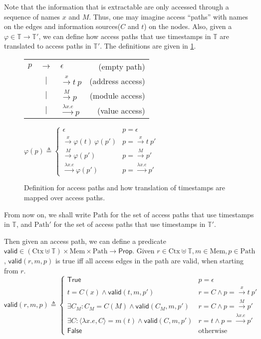 \documentclass{article}
\theoremstyle{definition}
\newcommand*{\Time}{\mathbb{T}}
\newcommand*{\Ctx}{\text{Ctx}}
\newcommand*{\Mem}{\text{Mem}}
\newcommand*{\mem}{m}
\newcommand*{\valid}{\mathsf{valid}}
\newcommand*{\Path}{\text{Path}}
\begin{document}
Note that the information that is extractable are only accessed through a sequence of names $x$ and $M$.
Thus, one may imagine access ``paths'' with names on the edges and information sources($C$ and $t$) on the nodes.
Also, given a $\varphi\in\Time\rightarrow\Time'$, we can define how access paths that use timestamps in $\Time$ are translated to access paths in $\Time'$.
The definitions are given in \ref{fig:accpath}.
\begin{figure}[h!]
  \centering
  \begin{tabular}{rclr}
    $p$ & $\rightarrow$ & $\epsilon$                   & (empty path)     \\
        & $|$           & $\xrightarrow{x}t\:p$        & (address access) \\
        & $|$           & $\xrightarrow{M}p$           & (module access)  \\
        & $|$           & $\xrightarrow{\lambda x.e}p$ & (value access)
  \end{tabular}\:
  $
    \varphi(p)\triangleq
    \begin{cases}
      \epsilon                               & p=\epsilon                    \\
      \xrightarrow{x}\varphi(t)\:\varphi(p') & p=\xrightarrow{x}t\:p'        \\
      \xrightarrow{M}\varphi(p')             & p=\xrightarrow{M}p'           \\
      \xrightarrow{\lambda x.e}\varphi(p')   & p=\xrightarrow{\lambda x.e}p'
    \end{cases}
  $
  \caption{Definition for access paths and how translation of timestamps are mapped over access paths.}
  \label{fig:accpath}
\end{figure}
From now on, we shall write $\Path$ for the set of access paths that use timestamps in $\Time$, and $\Path'$ for the set of access paths that use timestamps in $\Time'$.

Then given an access path, we can define a predicate $\valid\in(\Ctx\uplus\Time)\times\Mem\times\Path\rightarrow\mathsf{Prop}$.
Given $r\in\Ctx\uplus\Time,\mem\in\Mem,p\in\Path$, $\valid(r,\mem,p)$ is true iff all access edges in the path are valid, when starting from $r$.
\[
  \valid(r,\mem,p)\triangleq
  \begin{cases}
    \mathsf{True}                                                       & p=\epsilon                             \\
    t=C(x)\land\valid(t,\mem,p')                                        & r=C\land p=\xrightarrow{x}t\:p'        \\
    \exists C_M:C_M=C(M)\wedge\valid(C_M,\mem,p')                       & r=C\land p=\xrightarrow{M}p'           \\
    \exists C:\langle\lambda x.e,C\rangle=\mem(t)\land\valid(C,\mem,p') & r=t\land p=\xrightarrow{\lambda x.e}p' \\
    \mathsf{False}                                                      & \text{otherwise}
  \end{cases}
\]
\end{document}
